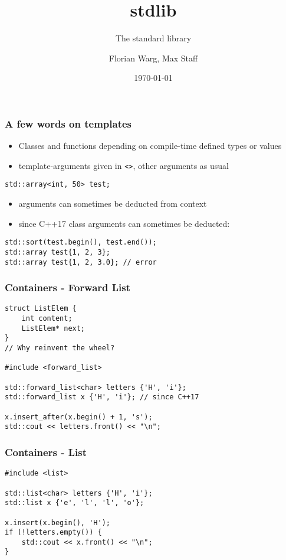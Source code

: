 
\usepackage{colortbl}
\usepackage{multirow}



\title{stdlib}
\subtitle{The standard library}
\date{\today}
\author{Florian Warg, Max Staff}

\maketitle

\begin{frame}[fragile]
    \frametitle{A few words on templates}
    \begin{itemize}
        \item Classes and functions depending on compile-time defined types or values
        \item template-arguments given in \lstinline{<>}, other arguments as usual
    \end{itemize}
    \begin{lstlisting}[numbers=none]
std::array<int, 50> test;
    \end{lstlisting}
    \begin{itemize}
        \item arguments can sometimes be deducted from context
        \item since C++17 class arguments can sometimes be deducted:
    \end{itemize}
    \begin{lstlisting}[numbers=none]
std::sort(test.begin(), test.end());
std::array test{1, 2, 3};
std::array test{1, 2, 3.0}; // error
    \end{lstlisting}
\end{frame}

\begin{frame}[fragile]
    \frametitle{Containers - Forward List}
    \begin{lstlisting}[numbers=none]
struct ListElem {
    int content;
    ListElem* next;
}
// Why reinvent the wheel?

#include <forward_list>

std::forward_list<char> letters {'H', 'i'};
std::forward_list x {'H', 'i'}; // since C++17

x.insert_after(x.begin() + 1, 's');
std::cout << letters.front() << "\n";
    \end{lstlisting}
\end{frame}

\begin{frame}[fragile]
    \frametitle{Containers - List}
    \begin{lstlisting}[numbers=none]
#include <list>

std::list<char> letters {'H', 'i'};
std::list x {'e', 'l', 'l', 'o'};

x.insert(x.begin(), 'H');
if (!letters.empty()) {
    std::cout << x.front() << "\n";
}
    \end{lstlisting}
\end{frame}

